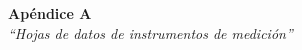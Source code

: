 \documentclass{article}
\begin{document}
\newpage \textit{}
\newpage



\newpage
\vspace*{4cm}
\begin{center}
	\textbf{\Huge{Apéndice A}} \\
	\bigskip\bigskip
	\Large{\textit{``Hojas de datos de instrumentos de medición''}}
\end{center}


\newpage \textit{}
\newpage
\end{document}
